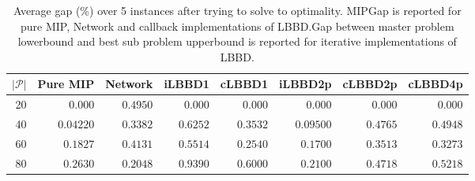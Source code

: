 \begin{table*}
    \centering
    \caption{Average gap (\%) over 5 instances after trying to solve to optimality. MIPGap is reported for pure MIP, Network and callback implementations of LBBD.\@ Gap between master problem lowerbound and best sub problem upperbound is reported for iterative implementations of LBBD.}\label{tab:avgGapOpt}
    \begin{tabular}{rrrrrrrr} \toprule
        $|\mathcal{P}|$ & Pure MIP & Network & iLBBD1 & cLBBD1 & iLBBD2p & cLBBD2p & cLBBD4p \\ \midrule
        20              & 0.000 &    $0.4950$     & 0.000 &  0.000 & 0.000 & 0.000 & 0.000 \\
        40              & $0.04220$ & $0.3382 $  & $0.6252 $ & $0.3532 $ & $0.09500 $ & $0.4765 $ & $0.4948$ \\
        60 & $0.1827 $ & $0.4131 $ & $0.5514 $ & $0.2540 $ & $0.1700 $ & $0.3513 $ & $0.3273 $ \\
        80 &  $0.2630 $ &  $0.2048 $ & $0.9390$ &  $0.6000 $ & $0.2100$ & $0.4718 $ & $0.5218$ \\
        \bottomrule
    \end{tabular}
\end{table*}
